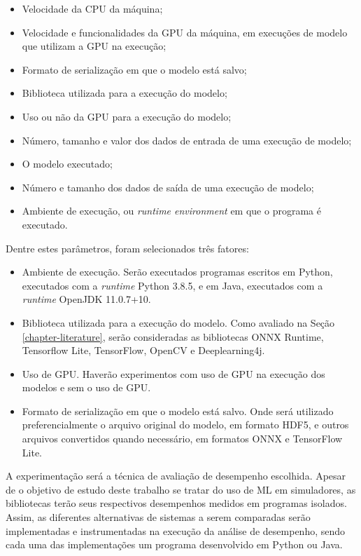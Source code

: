 \begin{itemize}
    \item Velocidade da CPU da máquina;
    \item Velocidade e funcionalidades da GPU da máquina, em execuções de modelo que utilizam a GPU na execução;
    \item Formato de serialização em que o modelo está salvo;
    \item Biblioteca utilizada para a execução do modelo;
    \item Uso ou não da GPU para a execução do modelo;
    \item Número, tamanho e valor dos dados de entrada de uma execução de modelo;
    \item O modelo executado;
    \item Número e tamanho dos dados de saída de uma execução de modelo;
    \item Ambiente de execução, ou \textit{runtime environment} em que o programa é executado.
\end{itemize}

Dentre estes parâmetros, foram selecionados três fatores:

\begin{itemize}
    \item Ambiente de execução. Serão executados programas escritos em Python, executados com a \textit{runtime} Python 3.8.5, e em Java, executados com a \textit{runtime} OpenJDK 11.0.7+10.
    \item Biblioteca utilizada para a execução do modelo. Como avaliado na Seção \ref{chapter-literature}, serão consideradas as bibliotecas ONNX Runtime, Tensorflow Lite, TensorFlow, OpenCV e Deeplearning4j.
    \item Uso de GPU. Haverão experimentos com uso de GPU na execução dos modelos e sem o uso de GPU.
    \item Formato de serialização em que o modelo está salvo. Onde será utilizado preferencialmente o arquivo original do modelo, em formato HDF5, e outros arquivos convertidos quando necessário, em formatos ONNX e TensorFlow Lite.
\end{itemize}

A experimentação será a técnica de avaliação de desempenho escolhida. Apesar de o objetivo de estudo deste trabalho se tratar do uso de ML em simuladores, as bibliotecas terão seus respectivos desempenhos medidos em programas isolados. Assim, as diferentes alternativas de sistemas a serem comparadas serão implementadas e instrumentadas na execução da análise de desempenho, sendo cada uma das implementações um programa desenvolvido em Python ou Java.

